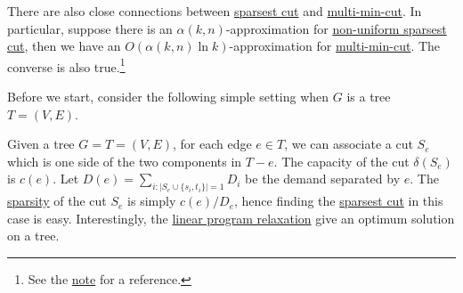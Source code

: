 \begin{remark}
	There are also close connections between \hyperref[prb:non-uniform-sparsest-cut]{sparsest cut} and \hyperref[prb:multi-min-cut]{multi-min-cut}. In particular, suppose there is an \(\alpha (k, n)\)-approximation for \hyperref[prb:non-uniform-sparsest-cut]{non-uniform sparsest cut}, then we have an \(O(\alpha (k, n) \ln k)\)-approximation for \hyperref[prb:multi-min-cut]{multi-min-cut}. The converse is also true.\footnote{See the \href{https://courses.grainger.illinois.edu/cs598csc/fa2024/Notes/lec-sparsest-cut.pdf}{note} for a reference.}
\end{remark}

Before we start, consider the following simple setting when \(G\) is a tree \(T = (V, E)\).

\begin{eg}[Tree]
	Given a tree \(G = T = (V, E)\), for each edge \(e \in T\), we can associate a cut \(S_e\) which is one side of the two components in \(T - e\). The capacity of the cut \(\delta (S_e)\) is \(c(e)\). Let \(D(e) = \sum_{i\colon \lvert S_e \cup \{ s_i, t_i \} \rvert = 1} D_i \) be the demand separated by \(e\). The \hyperref[def:sparsity]{sparsity} of the cut \(S_e\) is simply \(c(e) / D_e\), hence finding the \hyperref[prb:sparsest-cut]{sparsest cut} in this case is easy. Interestingly, the \hyperref[eq:non-uniform-sparsest-cut-LP-primal]{linear program relaxation} give an optimum solution on a tree.
\end{eg}
